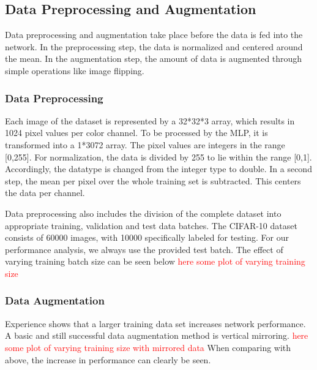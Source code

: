 \FloatBarrier
\subsection{Data Preprocessing and Augmentation}\label{subsec:preProp}

Data preprocessing and augmentation take place before the data is fed into the network. In the preprocessing step, the data is normalized and centered around the mean. In the augmentation step, the amount of data is augmented through simple operations like image flipping. 
 
\subsubsection{Data Preprocessing}\label{subsub:dataPreProp}

  	Each image of the dataset is represented by a 32*32*3 array, which results in 1024 pixel values per color channel. To be processed by the MLP, it is transformed into a 1*3072 array. The pixel values are integers in the range [0,255]. For normalization, the data is divided by 255 to lie within the range [0,1]. Accordingly, the datatype is changed from the integer type to double. In a second step, the mean per pixel over the whole training set is subtracted. This centers the data per channel.
  	
  	Data preprocessing also includes the division of the complete dataset into appropriate training, validation and test data batches. The CIFAR-10 dataset consists of 60000 images, with 10000 specifically labeled for testing. For our performance analysis, we always use the provided test batch. The effect of varying training batch size can be seen below \textcolor{red}{here some plot of varying training size}
  	
\subsubsection{Data Augmentation}
	    	
   	Experience shows that a larger training data set increases network performance. A basic and still successful data augmentation method is vertical mirroring. \textcolor{red}{here some plot of varying training size with mirrored data} When comparing with above, the increase in performance can clearly be seen.
   	
